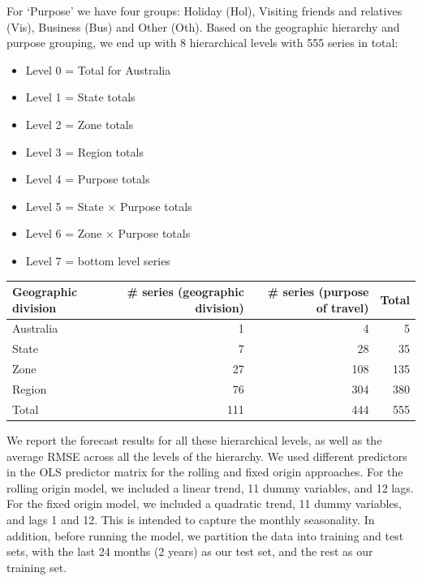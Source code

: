 \documentclass[11pt,a4paper,]{article}
\providecommand{\tightlist}{%
  \setlength{\itemsep}{0pt}\setlength{\parskip}{0pt}}
\let\origtable\table
\let\endorigtable\endtable
\renewenvironment{table}[1][2] {
    \expandafter\origtable\expandafter[!htbp]
} {
    \endorigtable
}
\begin{document}
For `Purpose' we have four groups: Holiday (Hol), Visiting friends and
relatives (Vis), Business (Bus) and Other (Oth). Based on the geographic
hierarchy and purpose grouping, we end up with 8 hierarchical levels
with 555 series in total:

\begin{itemize}
\tightlist
\item
  Level 0 = Total for Australia
\item
  Level 1 = State totals
\item
  Level 2 = Zone totals
\item
  Level 3 = Region totals
\item
  Level 4 = Purpose totals
\item
  Level 5 = State \(\times\) Purpose totals
\item
  Level 6 = Zone \(\times\) Purpose totals
\item
  Level 7 = bottom level series
\end{itemize}

\begin{table}[!h]

\caption{\label{tab:Australiageographicalpurposedivision}Number of Australian domestic tourism series in each level of the hierarchy and group structure.}
\centering
\begin{tabular}{lrrr}
\toprule
Geographic division & \# series (geographic division) & \# series (purpose of travel) & Total\\
\midrule
Australia & 1 & 4 & 5\\
State & 7 & 28 & 35\\
Zone & 27 & 108 & 135\\
Region & 76 & 304 & 380\\
Total & 111 & 444 & 555\\
\bottomrule
\end{tabular}
\end{table}

We report the forecast results for all these hierarchical levels, as
well as the average RMSE across all the levels of the hierarchy. We used
different predictors in the OLS predictor matrix for the rolling and
fixed origin approaches. For the rolling origin model, we included a
linear trend, 11 dummy variables, and 12 lags. For the fixed origin
model, we included a quadratic trend, 11 dummy variables, and lags 1 and
12. This is intended to capture the monthly seasonality. In addition,
before running the model, we partition the data into training and test
sets, with the last 24 months (2 years) as our test set, and the rest as
our training set.
\end{document}
